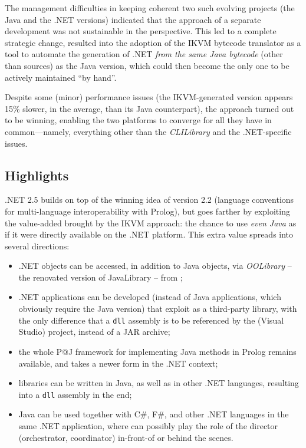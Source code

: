 The management difficulties in keeping coherent two such evolving projects (the Java and the .NET versions) indicated that the approach of a separate development was not sustainable in the perspective.
This led to a complete strategic change, resulted into the adoption of the IKVM \cite{ikvm} bytecode translator as a tool to automate the generation of \tuprolog.NET \textit{from the same Java bytecode} (other than sources) as the Java version, which could then become the only one to be actively maintained ``by hand''.

Despite some (minor) performance issues (the IKVM-generated \tuprolog{} version appears 15\% slower, in the average, than its Java counterpart), the approach turned out to be winning, enabling the two platforms to converge for all they have in common---namely, everything other than the \textit{CLILibrary} and the .NET-specific issues.

\subsection{Highlights}
\label{ssec:dotnet-highligths}

\tuprolog{}.NET 2.5 builds on top of the winning idea of version 2.2 (language conventions for multi-language interoperability with Prolog), but goes farther by exploiting the value-added brought by the IKVM approach: the chance to use \textit{even Java} as if it were directly available on the .NET platform.
%
This extra value spreads into several directions:
\begin{itemize}
  \item .NET objects can be accessed, in addition to Java objects, via \textit{OOLibrary} -- the renovated version of JavaLibrary -- from \tuprolog{};

  \item .NET applications can be developed (instead of Java applications, which obviously require the \tuprolog{} Java version) that exploit \tuprolog{} as a third-party library, with the only difference that a \texttt{dll} assembly is to be referenced by the (Visual Studio) project, instead of a JAR archive;

  \item the whole P@J framework for implementing Java methods in Prolog remains available, and takes a newer form in the .NET context;

  \item \tuprolog{} libraries can be written in Java, as well as in other .NET languages, resulting into a \texttt{dll} assembly in the end;

  \item Java can be used together with C\#, F\#, and other .NET languages in the same .NET application, where \tuprolog{} can possibly play the role of the director (orchestrator, coordinator) in-front-of or behind the scenes.
\end{itemize}

